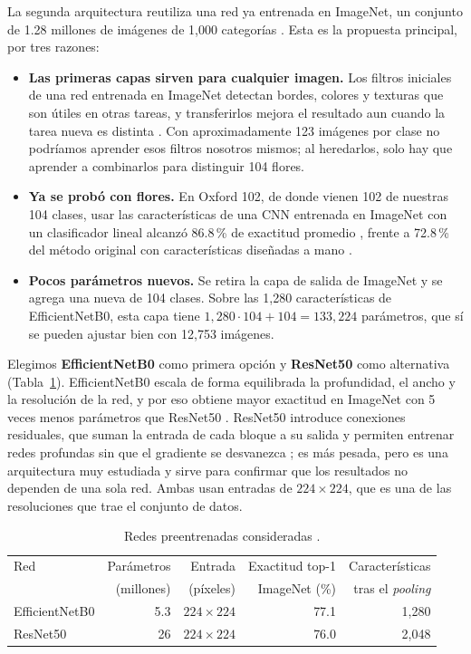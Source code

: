 La segunda arquitectura reutiliza una red ya entrenada en ImageNet, un conjunto de 1.28 millones de imágenes de 1,000 categorías \parencite{russakovsky2015}. Esta es la propuesta principal, por tres razones:

\begin{itemize}
    \item \textbf{Las primeras capas sirven para cualquier imagen.} Los filtros iniciales de una red entrenada en ImageNet detectan bordes, colores y texturas que son útiles en otras tareas, y transferirlos mejora el resultado aun cuando la tarea nueva es distinta \parencite{yosinski2014}. Con aproximadamente 123 imágenes por clase no podríamos aprender esos filtros nosotros mismos; al heredarlos, solo hay que aprender a combinarlos para distinguir 104 flores.
    \item \textbf{Ya se probó con flores.} En Oxford 102, de donde vienen 102 de nuestras 104 clases, usar las características de una CNN entrenada en ImageNet con un clasificador lineal alcanzó 86.8\,\% de exactitud promedio \parencite{razavian2014}, frente a 72.8\,\% del método original con características diseñadas a mano \parencite{nilsback2008}.
    \item \textbf{Pocos parámetros nuevos.} Se retira la capa de salida de ImageNet y se agrega una nueva de 104 clases. Sobre las 1,280 características de EfficientNetB0, esta capa tiene $1{,}280\cdot104+104=133{,}224$ parámetros, que sí se pueden ajustar bien con 12,753 imágenes.
\end{itemize}

Elegimos \textbf{EfficientNetB0} como primera opción y \textbf{ResNet50} como alternativa (Tabla~\ref{tab:preentrenadas}). EfficientNetB0 escala de forma equilibrada la profundidad, el ancho y la resolución de la red, y por eso obtiene mayor exactitud en ImageNet con 5 veces menos parámetros que ResNet50 \parencite{tan2019}. ResNet50 introduce conexiones residuales, que suman la entrada de cada bloque a su salida y permiten entrenar redes profundas sin que el gradiente se desvanezca \parencite{he2016}; es más pesada, pero es una arquitectura muy estudiada y sirve para confirmar que los resultados no dependen de una sola red. Ambas usan entradas de $224\times224$, que es una de las resoluciones que trae el conjunto de datos.

\begin{table}[H]
\centering
\caption{Redes preentrenadas consideradas \parencite{tan2019}.}
\label{tab:preentrenadas}
\begin{tabular}{lrrrr}
\toprule
Red & Parámetros & Entrada & Exactitud top-1 & Características \\
 & (millones) & (píxeles) & ImageNet (\%) & tras el \textit{pooling} \\
\midrule
EfficientNetB0 & 5.3 & $224\times224$ & 77.1 & 1,280 \\
ResNet50 & 26 & $224\times224$ & 76.0 & 2,048 \\
\bottomrule
\end{tabular}
\end{table}

